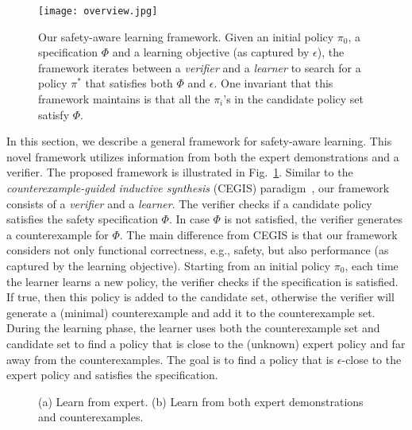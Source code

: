 \begin{figure}
\centering
  \texttt{[image: overview.jpg]}
\caption[Counterexample-Guided Apprenticeship Learning]{
Our safety-aware learning framework. Given an initial policy $\pi_0$, a specification $\Phi$ and a learning objective (as captured by $\epsilon$), the framework iterates between a {\it verifier} and a {\it learner} to search for a policy $\pi^*$ that satisfies both $\Phi$ and $\epsilon$. One invariant that this framework maintains is that all the $\pi_i$'s in the candidate policy set satisfy $\Phi$.}
\label{fig:sec4_1}
\end{figure}
In this section, we describe a general framework for safety-aware learning. 
This novel framework utilizes information from both the expert demonstrations and a verifier. 
The proposed framework is illustrated in Fig.~\ref{fig:sec4_1}. Similar to the \emph{counterexample-guided inductive synthesis} (CEGIS) paradigm~\cite{CEGIS}, our framework consists of a {\it verifier} and a {\it learner}. The verifier checks if a candidate policy satisfies the safety specification $\Phi$. In case $\Phi$ is not satisfied, the verifier generates a counterexample for $\Phi$. 
The main difference from CEGIS is that our framework considers not only functional correctness, e.g., safety, but also performance (as captured by the learning objective). Starting from an initial policy $\pi_0$, each time the learner learns a new policy, the verifier checks if the specification is satisfied. If true, then this policy is added to the candidate set, otherwise the verifier will generate a (minimal) counterexample and add it to the counterexample set. During the learning phase, the learner uses both the counterexample set and candidate set to find a policy that is close to the (unknown) expert policy and far away from the counterexamples. The goal is to find a policy that is $\epsilon$-close to the expert policy and satisfies the specification. 

\begin{figure}[h]
\centering
{}
\caption[Max margin principle]{(a) Learn from expert. (b) Learn from both expert demonstrations and counterexamples.}
\end{figure}

